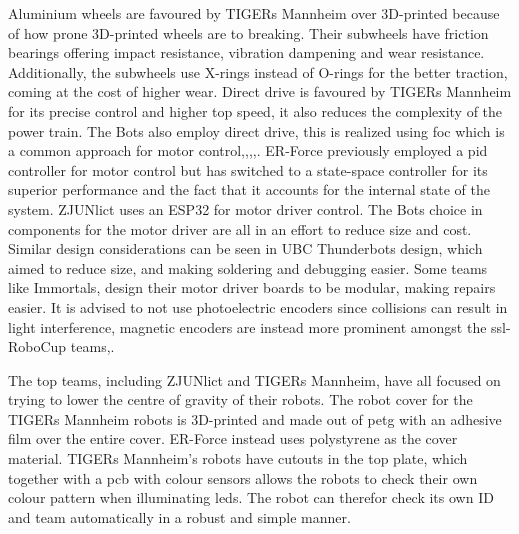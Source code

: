 Aluminium wheels are favoured by TIGERs Mannheim over 3D-printed because of how prone 3D-printed wheels are to breaking\:\cite{ryll_extended_2020}. Their subwheels have friction bearings offering impact resistance, vibration dampening and wear resistance\:\cite{ryll_extended_2020}. Additionally, the subwheels use X-rings instead of O-rings for the better traction, coming at the cost of higher wear\:\cite{ryll_extended_2020}. Direct drive is favoured by TIGERs Mannheim for its precise control and higher top speed, it also reduces the complexity of the power train\:\cite{ryll_extended_2020}.
The Bots also employ direct drive, this is realized using \ac{foc} which is a common approach for motor control\:\cite{veeraghanta_2024_2024},\cite{abousaleh_2024_2024},\cite{liang_icrs-fc_2024},\cite{delft_mercurians_delft_2024},\cite{salehi_immortals_2024}. 
ER-Force previously employed a \ac{pid} controller for motor control but has switched to a state-space controller for its superior performance and the fact that it accounts for the internal state of the system\:\cite{lobmeier_er-force_2018}.
ZJUNlict uses an ESP32 for motor driver control\:\cite{huang_zjunlict_2023}.
The Bots choice in components for the motor driver are all in an effort to reduce size and cost\:\cite{veeraghanta_2024_2024}. Similar design considerations can be seen in UBC Thunderbots design, which aimed to reduce size, and making soldering and debugging easier\:\cite{abousaleh_2024_2024}. Some teams like Immortals, design their motor driver boards to be modular, making repairs easier\:\cite{salehi_immortals_2024}.
It is advised to not use photoelectric encoders since collisions can result in light interference\:\cite{wu_compilation_2024}, magnetic encoders are instead more prominent amongst the \ac{ssl}-RoboCup teams\:\cite{wu_compilation_2024},\cite{veeraghanta_2024_2024}.

The top teams, including ZJUNlict and TIGERs Mannheim, have all focused on trying to lower the centre of gravity of their robots\:\cite{huang_zjunlict_2020}. 
The robot cover for the TIGERs Mannheim robots is 3D-printed and made out of \ac{petg} with an adhesive film over the entire cover\:\cite{ryll_extended_2020}. ER-Force instead uses polystyrene as the cover material\:\cite{bohm_er-force_2024}.
TIGERs Mannheim's robots have cutouts in the top plate, which together with a \ac{pcb} with colour sensors allows the robots to check their own colour pattern when illuminating \acp{led}\:\cite{ommer_extended_2022}. The robot can therefor check its own ID and team automatically in a robust and simple manner\:\cite{ommer_extended_2022}.

